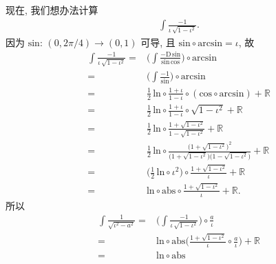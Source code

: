 \begin{example}
    现在, 我们想办法计算
    \begin{align*}
        \int {\frac{-1}{\iota\,\sqrt{1 - \iota^2}}}.
    \end{align*}
    因为 $\mathrm{sin}$: $(0, 2\pi/4) \to (0, 1)$ 可导,
    且 $\mathrm{sin} \circ \mathrm{arcsin} = \iota$,
    故
    \begin{align*}
        \int {\frac{-1}{\iota\,\sqrt{1 - \iota^2}}}
        = {} & \Bigg( \int {\frac{-\mathrm{D}\,\mathrm{sin}
        }{\mathrm{sin}\,\mathrm{cos}}} \Bigg) \circ \mathrm{arcsin}              \\
        = {} & \Bigg( \int {\frac{-1}{\mathrm{sin}}} \Bigg)
        \circ \mathrm{arcsin}                                                    \\
        = {} & \frac{1}{2}\,\mathrm{ln} \circ \frac{1 + \iota}{1 - \iota}
        \circ (\mathrm{cos} \circ \mathrm{arcsin}) + \mathbb{R}                  \\
        = {} & \frac{1}{2}\,\mathrm{ln} \circ \frac{1 + \iota}{1 - \iota}
        \circ \sqrt{1 - \iota^2} + \mathbb{R}                                    \\
        = {} & \frac{1}{2}\,\mathrm{ln} \circ \frac{1 + \sqrt{1 - \iota^2}}
        {1 - \sqrt{1 - \iota^2}} + \mathbb{R}                                    \\
        = {} & \frac{1}{2}\,\mathrm{ln} \circ \frac{\big( 1 + \sqrt{1 - \iota^2}
            \big)^2}
        {\big( 1 + \sqrt{1 - \iota^2} \big) \big( 1 - \sqrt{1 - \iota^2} \big)}
        + \mathbb{R}                                                             \\
        = {} & \bigg( \frac{1}{2}\,\mathrm{ln} \circ \iota^2 \bigg)
        \circ \frac{1 + \sqrt{1 - \iota^2}}{\iota} + \mathbb{R}                  \\
        = {} & \mathrm{ln} \circ \mathrm{abs}
        \circ \frac{1 + \sqrt{1 - \iota^2}}{\iota} + \mathbb{R}.
    \end{align*}
    所以
    \begin{align*}
        \int {\frac{1}{\sqrt{\iota^2 - a^2}}}
        = {} & \Bigg( \int {\frac{-1}{\iota\,\sqrt{1 - \iota^2}}} \Bigg)
        \circ \frac{a}{\iota}                                            \\
        = {} & \mathrm{ln} \circ \mathrm{abs}
        \Bigg( \frac{1 + \sqrt{1 - \iota^2}}{\iota} \circ \frac{a}{\iota}
        \Bigg) + \mathbb{R}                                              \\
        = {} & \mathrm{ln} \circ \mathrm{abs}

\end{align*}
\end{example}
